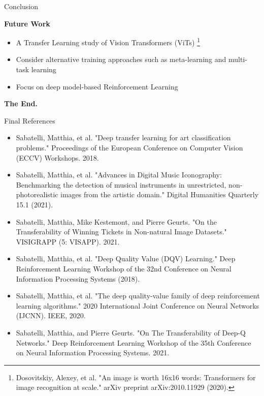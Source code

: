 \documentclass{beamer}
\begin{document}
\begin{frame}{Conclusion}

	\bigskip
	\begin{center}
		\textcolor{skymagenta}{\textbf{Future Work}}
	\end{center}

	\bigskip
	\begin{itemize}
		\item A Transfer Learning study of Vision Transformers (ViTs) \footnote{Dosovitskiy, Alexey, et al. "An image is worth 16x16 words: Transformers for image recognition at scale." arXiv preprint arXiv:2010.11929 (2020).}
		\item Consider alternative training approaches such as meta-learning and multi-task learning 
		\item Focus on deep model-based Reinforcement Learning
	\end{itemize}


\end{frame}

\begin{frame}
	\begin{center}
		\textcolor{skymagenta}{\textbf{The End.}}
	\end{center}
\end{frame}

\begin{frame}{Final References}
	\begin{itemize}
		\fontsize{6pt}{7.2}\selectfont
		\item Sabatelli, Matthia, et al. "Deep transfer learning for art classification problems." Proceedings of the European Conference on Computer Vision (ECCV) Workshops. 2018.
		\item Sabatelli, Matthia, et al. "Advances in Digital Music Iconography: Benchmarking the detection of musical instruments in unrestricted, non-photorealistic images from the artistic domain." Digital Humanities Quarterly 15.1 (2021).
		\item Sabatelli, Matthia, Mike Kestemont, and Pierre Geurts. "On the Transferability of Winning Tickets in Non-natural Image Datasets." VISIGRAPP (5: VISAPP). 2021.
		\item Sabatelli, Matthia, et al. "Deep Quality Value (DQV) Learning." Deep Reinforcement Learning Workshop of the 32nd Conference on Neural Information Processing Systems (2018).
		\item Sabatelli, Matthia, et al. "The deep quality-value family of deep reinforcement learning algorithms." 2020 International Joint Conference on Neural Networks (IJCNN). IEEE, 2020.
		\item Sabatelli, Matthia, and Pierre Geurts. "On The Transferability of Deep-Q Networks." Deep Reinforcement Learning Workshop of the 35th Conference on Neural Information Processing Systems. 2021.
	\end{itemize}

\end{frame}
\end{document}
